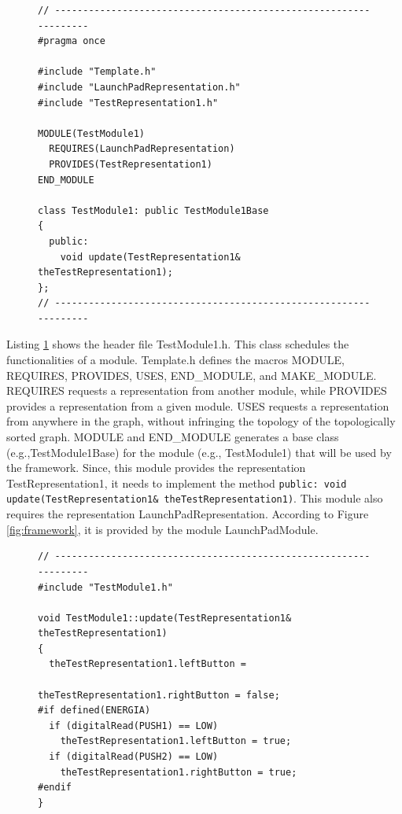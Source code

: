 \documentclass{llncs}
\begin{document}
\begin{sloppy}
\begin{figure}[!ht]
\begin{center}
\begin{verbatim}
// -----------------------------------------------------------------
#pragma once

#include "Template.h"
#include "LaunchPadRepresentation.h"
#include "TestRepresentation1.h"

MODULE(TestModule1)
  REQUIRES(LaunchPadRepresentation)
  PROVIDES(TestRepresentation1)
END_MODULE

class TestModule1: public TestModule1Base
{
  public:
    void update(TestRepresentation1& theTestRepresentation1);
}; 
// -----------------------------------------------------------------
\end{verbatim}
\end{center}
\label{list:TestModule1.h}
\end{figure}

Listing \ref{list:TestModule1.h} shows the header file {\sf TestModule1.h}. This class schedules
the functionalities of a module. {\sf Template.h} defines the macros {\sf MODULE}, {\sf REQUIRES},
{\sf PROVIDES}, {\sf USES}, {\sf END\_MODULE}, and {\sf MAKE\_MODULE}.  {\sf REQUIRES} requests a
representation from another module, while {\sf PROVIDES} provides a representation from a given
module. {\sf USES} requests a representation from anywhere in the graph, without infringing the
topology of the topologically sorted graph. {\sf MODULE} and {\sf END\_MODULE} generates a base
class (e.g.,{\sf TestModule1Base}) for the module (e.g., {\sf TestModule1}) that will be used by the
framework. Since, this module provides the representation {\sf TestRepresentation1}, it needs to
implement the method \texttt{public: void update(TestRepresentation1&
theTestRepresentation1)}. This module also requires the representation {\sf
LaunchPadRepresentation}. According to Figure \ref{fig:framework}, it is provided by the module
{\sf LaunchPadModule}. 


\begin{figure}[!ht]
\begin{center}
\begin{verbatim}
// -----------------------------------------------------------------
#include "TestModule1.h"

void TestModule1::update(TestRepresentation1& theTestRepresentation1)
{
  theTestRepresentation1.leftButton = 
                          theTestRepresentation1.rightButton = false;
#if defined(ENERGIA)
  if (digitalRead(PUSH1) == LOW)
    theTestRepresentation1.leftButton = true;
  if (digitalRead(PUSH2) == LOW)
    theTestRepresentation1.rightButton = true;
#endif
}


\end{verbatim}
\end{center}
\end{figure}
\end{sloppy}
\end{document}
